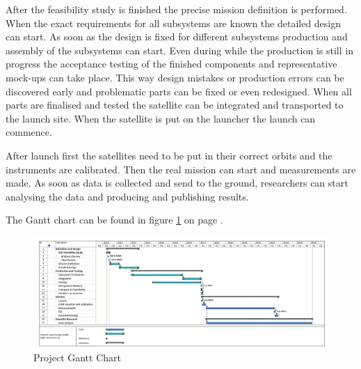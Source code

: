 After the feasibility study is finished the precise mission definition is performed. When the exact requirements for all subsystems are known the detailed design can start. As soon as the design is fixed for different subsystems production and assembly of the subsystems can start. Even during while the production is still in progress the acceptance testing of the finished components and representative mock-ups can take place. This way design mistakes or production errors can be discovered early and problematic parts can be fixed or even redesigned. When all parts are finalised and tested the satellite can be integrated and transported to the launch site. When the satellite is put on the launcher the launch can commence.

After launch first the satellites need to be put in their correct orbits and the instruments are calibrated. Then the real mission can start and measurements are made. As soon as data is collected and send to the ground, researchers can start analysing the data and producing and publishing results. 

The Gantt chart can be found in figure \ref{ganttchart} on page \pageref{ganttchart}.

\begin{figure}
\centering
\includegraphics[width=1.3\textwidth, angle=90]{chapters/img/projectganttchart.png}
\caption{Project Gantt Chart}
\label{ganttchart}
\end{figure}